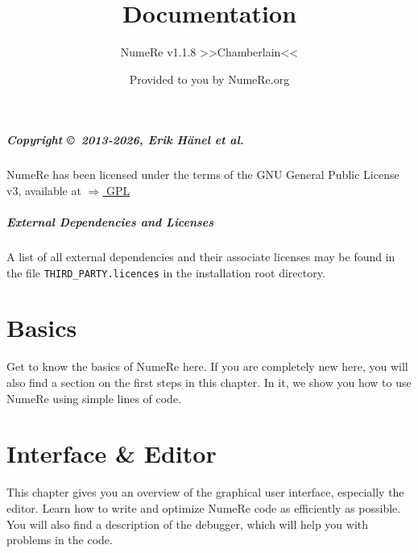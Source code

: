 \documentclass[DIV=17, parskip=half]{scrreprt}
\title{Documentation}
\subtitle{NumeRe v1.1.8 >>Chamberlain<<}
\date{}
\author{\small Provided to you by NumeRe.org}
\begin{document}
    \maketitle
% 
% 
	\tableofcontents
		\paragraph{Copyright \copyright\ 2013-2026, Erik H\"anel \emph{et al.}} 
		NumeRe has been licensed under the terms of the GNU General Public License v3, available at \href{http://www.gnu.org/licenses/gpl.html}{$\Rightarrow$ GPL}
		\paragraph{External Dependencies and Licenses} A list of all external dependencies and their associate licenses may be found in the file \verb!THIRD_PARTY.licences! in the installation root directory.
	\chapter{Basics}
		Get to know the basics of NumeRe here. If you are completely new here, you will also find a section on the first steps in this chapter. In it, we show you how to use NumeRe using simple lines of code.
		
		
		
		
		
		
		
		
		
		
	
	\chapter{Interface \& Editor}
		This chapter gives you an overview of the graphical user interface, especially the editor. Learn how to write and optimize NumeRe code as efficiently as possible. You will also find a description of the debugger, which will help you with problems in the code.
		
		
		
		
		
		
		
		
		
		
		
\end{document}
